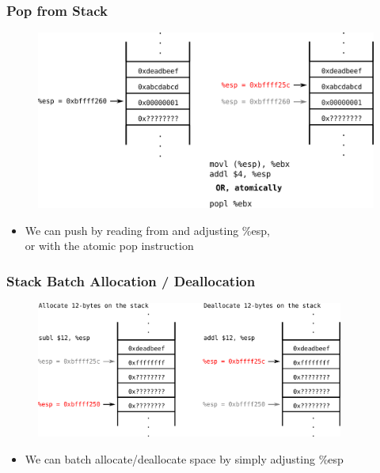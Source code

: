 \documentclass[11pt,xcolor=dvipsnames]{beamer}
\newcommand{\mvs}{\vspace{-0.95em}}
\begin{document}
\begin{frame}[fragile,t]
\frametitle{Pop from Stack}
\begin{figure}
\centering
\includegraphics[height=0.6\paperheight]{figures/x86stackpop.png}
\end{figure}
\begin{itemize}
\item We can push by reading from and adjusting {\ttfamily \%esp}, \\ or with the atomic {\ttfamily pop} instruction
\end{itemize}
\end{frame}

\begin{frame}[fragile]
\frametitle{Stack Batch Allocation / Deallocation}
\mvs
\begin{figure}
\centering
\includegraphics[width=0.90\textwidth]{figures/x86stackalloc.png}
\end{figure}
\begin{itemize}
\item We can batch allocate/deallocate space by simply adjusting {\ttfamily \%esp}
\end{itemize}
\end{frame}
\end{document}
